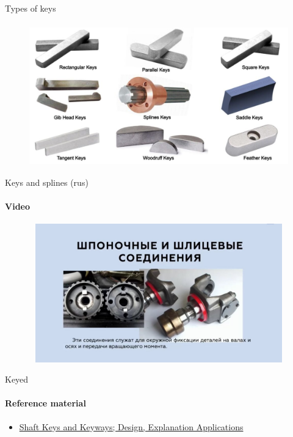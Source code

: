 \documentclass[aspectratio=169]{beamer}
\begin{document}
\begin{frame}[t]{Types of keys}
    \framesubtitle{}
    \vspace{-0.6cm}
    \begin{figure}[H]
        \centering\includegraphics[height=6cm,width=1\textwidth,keepaspectratio]{types_of_keys.jpg}
        \label{fig:types_of_keys.jpg}
    \end{figure}
\end{frame}

\begin{frame}[t]{Keys and splines (rus)}
    \framesubtitle{Video}
    \vspace{-0.6cm}
    \begin{figure}[H]
        \href{https://youtu.be/-bktOSXtLB8}{
            \centering\includegraphics[height=6cm,width=1\textwidth,keepaspectratio]{key_rus_video.jpg}}
        \label{fig:key_rus_video.jpg}
    \end{figure}
\end{frame}

\begin{frame}[t]{Keyed}
    \framesubtitle{Reference material}
    \begin{itemize}
        \item \href{https://mechanicalland.com/shaft-keys/}{Shaft Keys and Keyways; Design, Explanation Applications}
    \end{itemize}
\end{frame}
\end{document}
